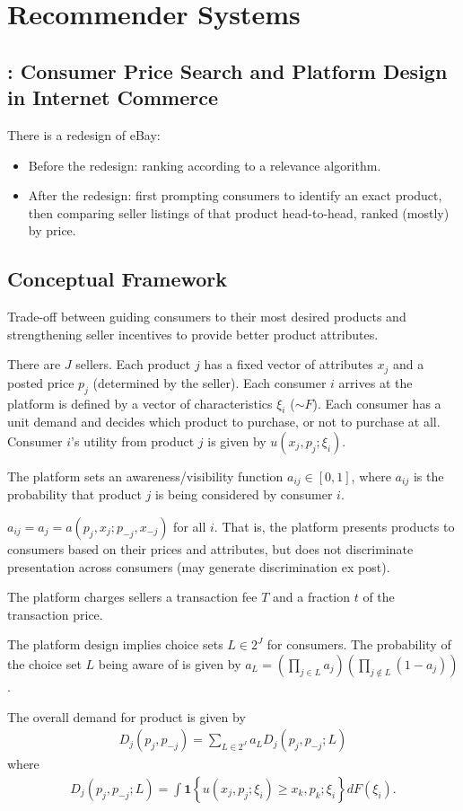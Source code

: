 \chapter{Recommender Systems}
\section{\cite{dinerstein2018consumer}: Consumer Price Search and Platform Design in Internet Commerce}
There is a redesign of eBay:
\begin{itemize}
    \item Before the redesign: ranking according to a relevance algorithm.
    \item After the redesign: first prompting consumers to identify an exact product, then comparing seller listings of that product  head-to-head, ranked (mostly) by price.
\end{itemize}

\section{Conceptual Framework}
Trade-off between guiding consumers to their most desired products and strengthening seller  incentives to provide better product attributes.

There are $J$ sellers. Each product $j$ has a fixed vector of attributes $x_j$ and a posted price $p_j$ (determined by the seller). Each consumer $i$ arrives at the platform is defined by a vector of characteristics $\xi_i$ ($\sim F$). Each consumer has a unit demand and decides which product to purchase, or not to purchase at all. Consumer $i$'s utility from product $j$ is given by $u(x_j,p_j;\xi_i)$.

The platform sets an awareness/visibility function $a_{ij}\in[0,1]$, where $a_{ij}$ is the probability that product $j$ is being considered by consumer $i$.
\begin{assumption}
    $a_{ij}=a_j=a(p_j,x_j;p_{-j},x_{-j})$ for all $i$. That is, the platform presents products to consumers based on their prices and attributes, but does not discriminate presentation across consumers (may generate discrimination ex post).
\end{assumption}
The platform charges sellers a transaction fee $T$ and a fraction $t$ of the transaction price.

The platform design implies choice sets $L\in 2^J$ for consumers. The probability of the choice set $L$ being aware of is given by $a_L=\left(\prod_{j\in L}a_j\right)\left(\prod_{j\not\in L}(1-a_j)\right)$.

The overall demand for product is given by
\begin{equation}
    \begin{aligned}
        D_j(p_j,p_{-j})=\sum_{L\in 2^J}a_L D_j(p_j,p_{-j};L)
    \end{aligned}
    \nonumber
\end{equation}
where
\begin{equation}
    \begin{aligned}
        D_j(p_j,p_{-j};L)=\int \mathbf{1}\left\{u(x_j,p_j;\xi_i)\geq x_k,p_k;\xi_i\right\}d F(\xi_i).
    \end{aligned}
    \nonumber
\end{equation}